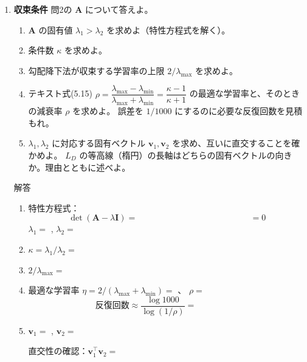 \documentclass[a4paper,dvipdfmx]{jsarticle}
\newcommand{\提出期限}{2026年10月26日（月）}
\newcommand{\学籍番号}{0000000}
\newcommand{\氏名}{氏名を書く}
\newcommand{\提出日}{2026年10月26日}
\newenvironment{answer}{\begin{itembox}[l]{解答}}{\end{itembox}}
\begin{document}
\begin{enumerate}
  \item \textbf{収束条件}\quad
    問2の $\bm{A}$ について答えよ。
    \begin{enumerate}
      \item $\bm{A}$ の固有値 $\lambda_1 > \lambda_2$ を求めよ（特性方程式を解く）。
      \item 条件数 $\kappa$ を求めよ。
      \item 勾配降下法が収束する学習率の上限 $2/\lambda_{\max}$ を求めよ。
      \item テキスト式(5.15) $\rho = \dfrac{\lambda_{\max} - \lambda_{\min}}{\lambda_{\max} + \lambda_{\min}} = \dfrac{\kappa - 1}{\kappa + 1}$
        の最適な学習率と、そのときの減衰率 $\rho$ を求めよ。
        誤差を $1/1000$ にするのに必要な反復回数を見積もれ。
      \item $\lambda_1, \lambda_2$ に対応する固有ベクトル $\bm{v}_1, \bm{v}_2$ を求め、互いに直交することを確かめよ。
        $L_D$ の等高線（楕円）の長軸はどちらの固有ベクトルの向きか。理由とともに述べよ。
    \end{enumerate}
    \begin{answer}
      \begin{enumerate}
        \item 特性方程式：
          \begin{equation*}
            \det(\bm{A} - \lambda\bm{I}) = \phantom{XXXXXXXXXXXXXXXX} = 0
          \end{equation*}
          $\lambda_1 = $ \phantom{XXXXXX}, \quad $\lambda_2 = $ \phantom{XXXXXX}
        \item $\kappa = \lambda_1/\lambda_2 = $ \phantom{XXXXXX}
        \item $2/\lambda_{\max} = $ \phantom{XXXXXX}
        \item 最適な学習率 $\eta = 2/(\lambda_{\max} + \lambda_{\min}) = $ \phantom{XXXX}、
          $\rho = $ \phantom{XXXXXX}
          \begin{equation*}
            \text{反復回数} \approx \frac{\log 1000}{\log(1/\rho)} = \phantom{XXXXXX}
          \end{equation*}
        \item $\bm{v}_1 = $ \phantom{XXXXXX}, \quad $\bm{v}_2 = $ \phantom{XXXXXX}
          \vspace{4mm}

          直交性の確認：$\bm{v}_1^\top\bm{v}_2 = $ \phantom{XXXXXXXX}
          \vspace{4mm}


\end{enumerate}
\end{answer}
\end{enumerate}
\end{document}
